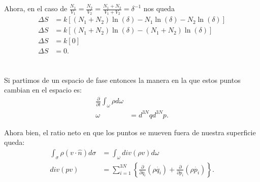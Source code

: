 \documentclass{report}
\begin{document}
Ahora, en el caso de $\frac{N_1}{V_1} = \frac{N_2}{V_2} = \frac{N_1 + N_2}{V_1 + V_2} = \delta^{-1}$ nos queda
\begin{align*}
    \Delta S &= k\left[ \left( N_1 + N_2 \right) \ln\left( \delta \right) - N_1\ln\left( \delta \right) - N_2\ln\left( \delta \right) \right]\\
    \Delta S &= k\left[ \left( N_1 + N_2 \right) \ln\left( \delta \right) - \left( N_1 + N_2 \right) \ln\left( \delta \right)\right]\\
    \Delta S &= k\left[0\right]\\
    \Delta S &= 0
.\end{align*}

\chapter{}

\section{}

Si partimos de un espacio de fase entonces la manera en la que estos puntos cambian en el espacio es:
\begin{align*}
  \frac{\partial}{\partial t} \int_{\omega} \rho d\omega\\
  \omega &= d^{3N}q d^{3N}p
.\end{align*}

Ahora bien, el ratio neto en que los puntos se mueven fuera de nuestra superficie queda:
\begin{align*}
  \int_{\sigma} \rho\left( v\cdot \hat{n} \right) d\sigma&= \int_{\omega} div\left( \rho v \right) d\omega \\
  div(pv) &= \sum_{i=1}^{3N} \left\{ \frac{\partial}{\partial q_i} \left( \rho \dot{q_i} \right) + \frac{\partial}{\partial p_i} \left( \rho \dot{p_i}\right)  \right\} 
.\end{align*}
\end{document}
